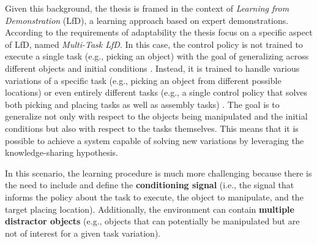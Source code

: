 Given this background, the thesis is framed in the context of \textit{Learning from Demonstration} (LfD), a learning approach based on expert demonstrations. According to the requirements of adaptability the thesis focus on a specific aspect of LfD, named \textit{Multi-Task LfD}. In this case, the control policy is not trained to execute a single task (e.g., picking an object) with the goal of generalizing across different objects and initial conditions \cite{zhang2018deep_vr_teleoperation,mandlekar2022matters}. Instead, it is trained to handle various variations of a specific task (e.g., picking an object from different possible locations) \cite{dasari2021transformers_one_shot} or even entirely different tasks (e.g., a single control policy that solves both picking and placing tasks as well as assembly tasks) \cite{brohan2022rt,mandi2022towards_more_generalizable_one_shot}. The goal is to generalize not only with respect to the objects being manipulated and the initial conditions but also with respect to the tasks themselves. This means that it is possible to achieve a system capable of solving new variations by leveraging the knowledge-sharing hypothesis.

In this scenario, the learning procedure is much more challenging because there is the need to include and define the \textbf{conditioning signal} (i.e., the signal that informs the policy about the task to execute, the object to manipulate, and the target placing location). Additionally, the environment can contain \textbf{multiple distractor objects} (e.g., objects that can potentially be manipulated but are not of interest for a given task variation). 

